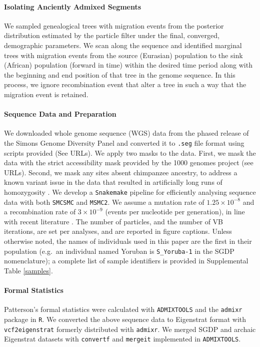 \paragraph{Isolating Anciently Admixed Segments} We sampled genealogical trees with migration events from the posterior distribution estimated by the particle filter under the final, converged, demographic parameters. We scan along the sequence and identified marginal trees with migration events from the source (Eurasian) population to the sink (African) population (forward in time) within the desired time period along with the beginning and end position of that tree in the genome sequence. In this process, we ignore recombination event that alter a tree in such a way that the migration event is retained.  

\paragraph{Sequence Data and Preparation}  We downloaded whole genome sequence (WGS) data from the phased release of the Simons Genome Diversity Panel and converted it to {\tt .seg} file format using scripts provided (See URLs). We apply two masks to the data. First, we mask the data with the strict accessibility mask provided by the 1000 genomes project (see URLs). Second, we mask any sites absent chimpanzee ancestry, to address a known variant issue in the data that resulted in artificially long runs of homozygosity \cite{Wang2019a}. We develop a {\tt Snakemake} \cite{Koster2012} pipeline for efficiently analysing sequence data with both {\tt SMCSMC} and {\tt MSMC2}. We assume a mutation rate of $1.25\times10^{-8}$ and a recombination rate of $3\times10^{-9}$ (events per nucleotide per generation), in line with recent literature \cite{Scally2012, Schiffels2014a}. The number of particles, and the number of VB iterations, are set per analyses, and are reported in figure captions. Unless otherwise noted, the names of individuals used in this paper are the first in their population (e.g.\ an individual named Yoruban is {\tt S\_Yoruba-1} in the SGDP nomenclature); a complete list of sample identifiers is provided in Supplemental Table \ref{samples}. 

\paragraph{Formal Statistics} Patterson's formal statistics were calculated with {\tt ADMIXTOOLS} \cite{Patterson2012} and the {\tt admixr} package \cite{Petr2019} in {\tt R}. We converted the above sequence data to Eigenstrat format with {\tt vcf2eigenstrat} %
formerly distributed with {\tt admixr}. We merged SGDP and archaic Eigenstrat datasets with {\tt convertf} and {\tt mergeit} implemented in {\tt ADMIXTOOLS}. 


